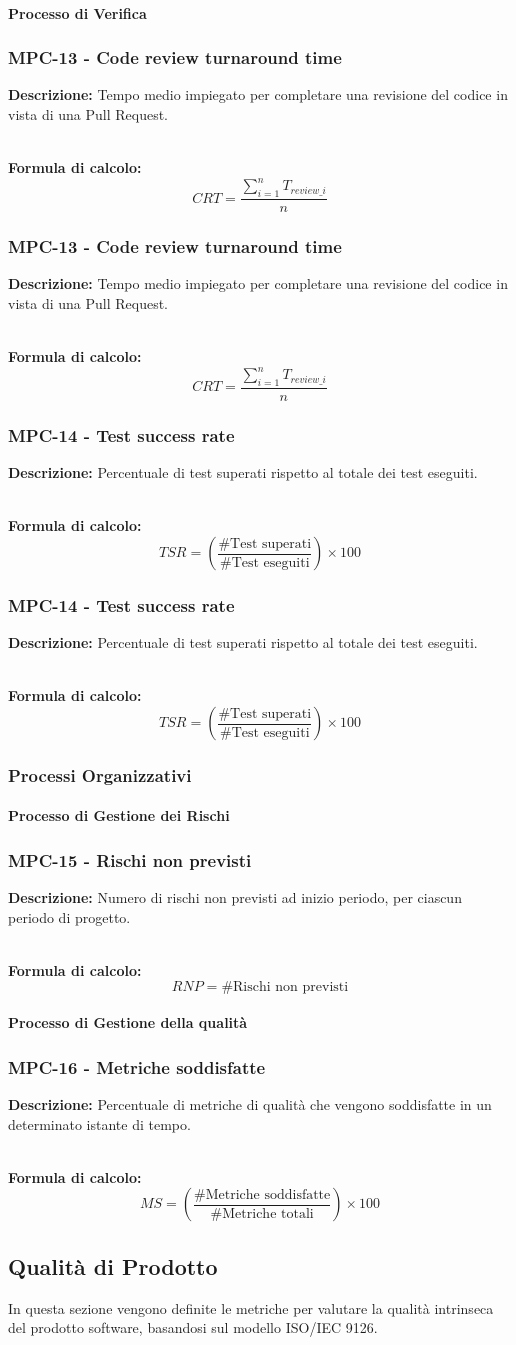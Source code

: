 \documentclass[a4paper,12pt]{article}
\newcommand{\metricdef}[3]{
    \subsubsection*{#1 - #2}
    \textbf{Descrizione:} #3
}
\newcommand{\metricformula}[1]{
    \\[0.5em]
    \textbf{Formula di calcolo:}
    \begin{equation*}
        #1
    \end{equation*}
}
\begin{document}
\paragraph{Processo di Verifica}

\metricdef{MPC-13}{Code review turnaround time}{Tempo medio impiegato per completare una revisione del codice in vista di una Pull Request.}
\metricformula{CRT = \frac{\sum_{i=1}^{n} T_{review\_i}}{n}}
\metricdef{MPC-13}{Code review turnaround time}{Tempo medio impiegato per completare una revisione del codice in vista di una Pull Request.}
\metricformula{CRT = \frac{\sum_{i=1}^{n} T_{review\_i}}{n}}

\metricdef{MPC-14}{Test success rate}{Percentuale di test superati rispetto al totale dei test eseguiti.}
\metricformula{TSR = \left( \frac{\#\text{Test superati}}{\#\text{Test eseguiti}} \right) \times 100}
\metricdef{MPC-14}{Test success rate}{Percentuale di test superati rispetto al totale dei test eseguiti.}
\metricformula{TSR = \left( \frac{\#\text{Test superati}}{\#\text{Test eseguiti}} \right) \times 100}

\subsubsection{Processi Organizzativi}

\paragraph{Processo di Gestione dei Rischi} \label{gestione_rischi_operativi}

\metricdef{MPC-15}{Rischi non previsti}{Numero di rischi non previsti ad inizio periodo, per ciascun periodo di progetto.}
\metricformula{RNP = \#\text{Rischi non previsti}}

\paragraph{Processo di Gestione della qualità}

\metricdef{MPC-16}{Metriche soddisfatte}{Percentuale di metriche di qualità che vengono soddisfatte in un determinato istante di tempo.}
\metricformula{MS = \left( \frac{\#\text{Metriche soddisfatte}}{\#\text{Metriche totali}} \right) \times 100}

\subsection{Qualità di Prodotto}
In questa sezione vengono definite le metriche per valutare la qualità intrinseca del prodotto software, basandosi sul modello ISO/IEC 9126.
\end{document}
